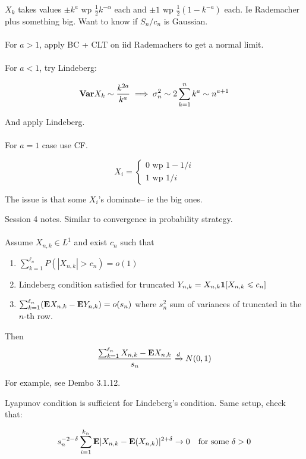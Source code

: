 \documentclass{article}
\begin{document}
\begin{example}[2007 Problem 1]
$X_k$ takes values $\pm k^a$ wp $\frac{1}{2} k^{-\alpha}$ each and $\pm 1$ wp $\frac{1}{2} (1-k^{-a})$ each. Ie Rademacher plus something big. Want to know if $S_n/c_n$ is Gaussian. \\\\

For $a>1$, apply BC + CLT on iid Rademachers to get a normal limit.\\\\

For $a<1$, try Lindeberg:


$$\mathbf{Var} X_k \sim \frac{k^{2a}}{k^a} \implies \sigma_n^2 \sim 2 \sum_{k=1}^n k^a \sim n^{a+1}$$

And apply Lindeberg. \\\\

For $a=1$ case use CF. 


\end{example}

\begin{example}
$$X_i = \begin{cases}
	0 \text{ wp } 1-1/i\\
		1 \text{ wp } 1/i
		\end{cases}$$
		
The issue is that some $X_i$'s  dominate-- ie the big ones.
\end{example}

\begin{example}
\end{example}


\begin{recipe}
Session 4 notes. Similar to convergence in probability strategy. \\\\
Assume $X_{n,k} \in L^1$ and exist $c_n$ such that 

\begin{enumerate}
	\item $\sum_{k=1}^{\ell_n} P(|X_{n,k}| > c_n) = o(1)$
	\item Lindeberg condition satisfied for truncated $Y_{n,k} =X_{n,k} \boldsymbol{1} [X_{n,k} \leqslant c_n]$
	\item $\sum_{k=1}^{\ell_n} (\mathbf{E} X_{n,k} - \mathbf{E} Y_{n,k}) = o(s_n)$ where $s_n^2$ sum of variances of truncated in the $n$-th row.
\end{enumerate}
Then $$\frac{\sum_{k=1}^{\ell_n} X_{n,k} - \mathbf{E} X_{n,k}}{s_n} \xrightarrow{d} N(0,1)$$

For example, see Dembo 3.1.12.
\end{recipe}
\begin{theorem}
Lyapunov condition is sufficient for Lindeberg's condition. Same setup, check that:


$$s_n^{-2-\delta} \sum_{i=1}^{k_n} \mathbf{E} |X_{n,k} - \mathbf{E} (X_{n,k})|^{2+\delta} \to 0 \quad \text{for some } \delta > 0$$
\end{theorem}
\end{document}
